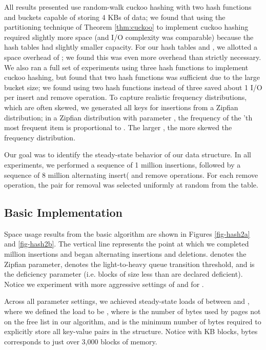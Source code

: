 \documentclass[11pt,letterpaper]{article}
\begin{document}
All results presented use random-walk cuckoo hashing with two hash
functions and buckets capable of storing 4 KBs of data; we found that
using the partitioning technique of Theorem \ref{thm:cuckoo} to
implement cuckoo hashing required slightly more space (and I/O
complexity was comparable) because the hash tables had slightly
smaller capacity. 
For our hash tables  and , we allotted a space overhead of 
; we found this was even more overhead than strictly necessary.
We also ran a full set of experiments using three
hash functions to implement cuckoo hashing, but found that two hash
functions was sufficient due to the large bucket size; we found using two hash
functions instead of three saved about 1 I/O per insert and remove
operation.
To capture realistic frequency distributions, which are often skewed, we generated all keys for insertions from a Zipfian distribution; in a Zipfian distribution with parameter , the frequency of the 'th most frequent item is proportional to . The larger , the more skewed the frequency distribution.

Our goal was to identify the steady-state behavior of our data structure. In all experiments, we performed a sequence of 1 million insertions, followed by a sequence of 8 million alternating insert( and remove operations.  For each remove operation, the pair for removal was selected uniformly at random from the table. 

\subsection{Basic Implementation}
\label{exp:am}

Space usage results from the basic algorithm are shown in Figures \ref{fig-hash2a} and \ref{fig-hash2b}.  The vertical line represents the point at which we completed  million insertions and began alternating insertions and deletions.  denotes the Zipfian parameter,  denotes the light-to-heavy queue transition threshold, and  is the deficiency parameter (i.e. blocks of size less than  are declared deficient). Notice we experiment with more aggressive settings of  and  for .  

Across all parameter settings, we achieved steady-state loads of between  and , where we defined the load to be , where  is the number of bytes used by pages not on the free list in our algorithm, and  is the minimum number of bytes required to explicitly store all  key-value pairs in the structure. Notice with  KB blocks,  bytes corresponds to just over 3,000 blocks of memory. 
\end{document}
